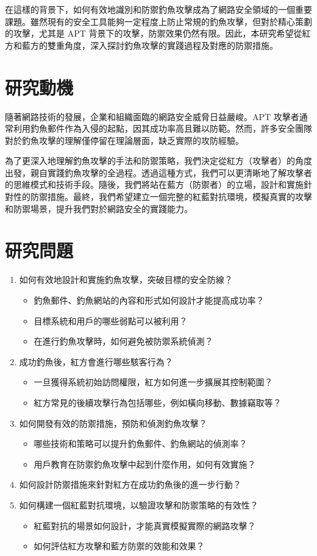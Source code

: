 \documentclass[a4paper,12pt]{article}
\begin{document}
在這樣的背景下，如何有效地識別和防禦釣魚攻擊成為了網路安全領域的一個重要課題。雖然現有的安全工具能夠一定程度上防止常規的釣魚攻擊，但對於精心策劃的攻擊，尤其是 APT 背景下的攻擊，防禦效果仍然有限。因此，本研究希望從紅方和藍方的雙重角度，深入探討釣魚攻擊的實踐過程及對應的防禦措施。

\section{研究動機}
隨著網路技術的發展，企業和組織面臨的網路安全威脅日益嚴峻。APT 攻擊者通常利用釣魚郵件作為入侵的起點，因其成功率高且難以防範。然而，許多安全團隊對於釣魚攻擊的理解僅停留在理論層面，缺乏實際的攻防經驗。

為了更深入地理解釣魚攻擊的手法和防禦策略，我們決定從紅方（攻擊者）的角度出發，親自實踐釣魚攻擊的全過程。透過這種方式，我們可以更清晰地了解攻擊者的思維模式和技術手段。隨後，我們將站在藍方（防禦者）的立場，設計和實施針對性的防禦措施。最終，我們希望建立一個完整的紅藍對抗環境，模擬真實的攻擊和防禦場景，提升我們對於網路安全的實踐能力。

\section{研究問題}
\begin{enumerate}
  \item 如何有效地設計和實施釣魚攻擊，突破目標的安全防線？
    \begin{itemize}
      \item 釣魚郵件、釣魚網站的內容和形式如何設計才能提高成功率？
      \item 目標系統和用戶的哪些弱點可以被利用？
      \item 在進行釣魚攻擊時，如何避免被防禦系統偵測？
    \end{itemize}
  \item 成功釣魚後，紅方會進行哪些駭客行為？
    \begin{itemize}
      \item 一旦獲得系統初始訪問權限，紅方如何進一步擴展其控制範圍？
      \item 紅方常見的後續攻擊行為包括哪些，例如橫向移動、數據竊取等？
    \end{itemize}
  \item 如何開發有效的防禦措施，預防和偵測釣魚攻擊？
    \begin{itemize}
      \item 哪些技術和策略可以提升釣魚郵件、釣魚網站的偵測率？
      \item 用戶教育在防禦釣魚攻擊中起到什麼作用，如何有效實施？
    \end{itemize}
  \item 如何設計防禦措施來針對紅方在成功釣魚後的進一步行動？
  \item 如何構建一個紅藍對抗環境，以驗證攻擊和防禦策略的有效性？
    \begin{itemize}
      \item 紅藍對抗的場景如何設計，才能真實模擬實際的網路攻擊？
      \item 如何評估紅方攻擊和藍方防禦的效能和效果？
    \end{itemize}
\end{enumerate}
\end{document}
